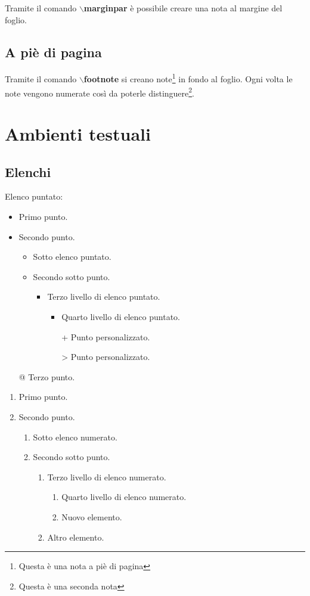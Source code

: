 \documentclass[a4paper, 12pt]{book}
\theoremstyle{plain}
\begin{document}
	Tramite il comando \textbf{$\backslash$marginpar} è possibile creare una nota al margine del foglio.
	
	\subsection{A piè di pagina}
	
	Tramite il comando \textbf{$\backslash$footnote} si creano note\footnote{Questa è una nota a piè di pagina} in fondo al foglio. Ogni volta le note vengono numerate così da poterle distinguere\footnote{Questa è una seconda nota}.
	
	\section{Ambienti testuali}
	\subsection{Elenchi}
	Elenco puntato:
	\begin{itemize}
		\item Primo punto.
		\item Secondo punto.
		\begin{itemize}
			\item Sotto elenco puntato.
			\item Secondo sotto punto.
			\begin{itemize}
				\item Terzo livello di elenco puntato.
				\begin{itemize}
					\item Quarto livello di elenco puntato.
					\item [+] Punto personalizzato.
					\item [>] Punto personalizzato.
				\end{itemize}
			\end{itemize}
		\end{itemize}
	\item [@] Terzo punto.
	\end{itemize}

	\begin{enumerate}
		\item Primo punto.
		\item Secondo punto.
		\begin{enumerate}
			\item Sotto elenco numerato.
			\item Secondo sotto punto.
			\begin{enumerate}
				\item Terzo livello di elenco numerato.
				\begin{enumerate}
					\item Quarto livello di elenco numerato.
					\item Nuovo elemento.
				\end{enumerate}
			\item Altro elemento.
			\end{enumerate}
		\end{enumerate}
	\end{enumerate}
	
\end{document}
